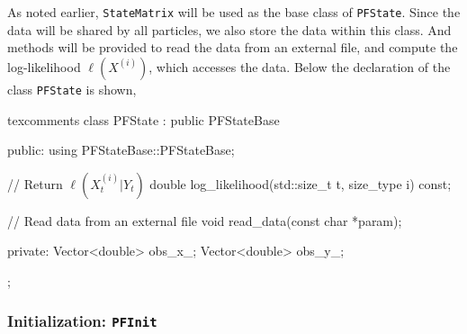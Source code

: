 As noted earlier, \verb|StateMatrix| will be used as the base class of
\verb|PFState|. Since the data will be shared by all particles, we also store
the data within this class. And methods will be provided to read the data from
an external file, and compute the log-likelihood $\ell(X^{(i)})$, which
accesses the data. Below the declaration of the class \verb|PFState| is shown,
\begin{cppcode*}{texcomments}
  class PFState : public PFStateBase
  {
      public:
      using PFStateBase::PFStateBase;

      // Return $\ell(X_t^{(i)}|Y_t)$
      double log_likelihood(std::size_t t, size_type i) const;

      // Read data from an external file
      void read_data(const char *param);

      private:
      Vector<double> obs_x_;
      Vector<double> obs_y_;
  };
\end{cppcode*}

\subsubsection{Initialization: \texttt{PFInit}}

